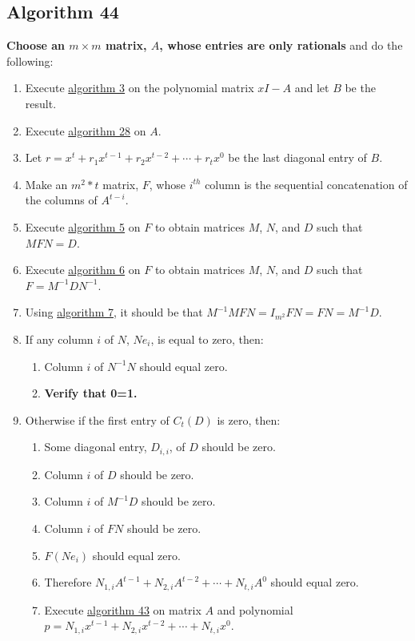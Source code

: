 \documentclass[twocolumn]{article}
\begin{document}
		\subsection{Algorithm 44}\label{sec:algorithm 44}
			\textbf{Choose an $m\times m$ matrix, $A$, whose entries are only rationals} and do the following:
			\begin{enumerate}
				\item Execute \hyperref[sec:algorithm 3]{algorithm 3} on the polynomial matrix $xI-A$ and let $B$ be the result.
				\item Execute \hyperref[sec:algorithm 28]{algorithm 28} on $A$.
				\item Let $r=x^t+r_1x^{t-1}+r_2x^{t-2}+\cdots+r_tx^0$ be the last diagonal entry of $B$.
				\item Make an $m^2*t$ matrix, $F$, whose $i^{th}$ column is the sequential concatenation of the columns of $A^{t-i}$.
				\item Execute \hyperref[sec:algorithm 5]{algorithm 5} on $F$ to obtain matrices $M$, $N$, and $D$ such that $MFN=D$.
				\item Execute \hyperref[sec:algorithm 6]{algorithm 6} on $F$ to obtain matrices $M$, $N$, and $D$ such that $F=M^{-1}DN^{-1}$.
				\item Using \hyperref[sec:algorithm 7]{algorithm 7}, it should be that $M^{-1}MFN=I_{m^2}FN=FN=M^{-1}D$.
				\item If any column $i$ of $N$, $Ne_i$, is equal to zero, then:
				\begin{enumerate}
					\item Column $i$ of $N^{-1}N$ should equal zero.
					\item \textbf{Verify that 0=1.}
				\end{enumerate}
				\item Otherwise if the first entry of $C_t(D)$ is zero, then:
				\begin{enumerate}
					\item Some diagonal entry, $D_{i,i}$, of $D$ should be zero.
					\item Column $i$ of $D$ should be zero.
					\item Column $i$ of $M^{-1}D$ should be zero.
					\item Column $i$ of $FN$ should be zero.
					\item $F(Ne_i)$ should equal zero.
					\item Therefore $N_{1,i}A^{t-1}+N_{2,i}A^{t-2}+\cdots+N_{t,i}A^0$ should equal zero.
					\item Execute \hyperref[sec:algorithm 43]{algorithm 43} on matrix $A$ and polynomial $p=N_{1,i}x^{t-1}+N_{2,i}x^{t-2}+\cdots+N_{t,i}x^0$.

\end{enumerate}
\end{enumerate}
\end{document}
